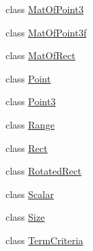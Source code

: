 \begin{DoxyCompactItemize}
\item 
class \mbox{\hyperlink{classorg_1_1opencv_1_1core_1_1_mat_of_point3}{Mat\+Of\+Point3}}
\item 
class \mbox{\hyperlink{classorg_1_1opencv_1_1core_1_1_mat_of_point3f}{Mat\+Of\+Point3f}}
\item 
class \mbox{\hyperlink{classorg_1_1opencv_1_1core_1_1_mat_of_rect}{Mat\+Of\+Rect}}
\item 
class \mbox{\hyperlink{classorg_1_1opencv_1_1core_1_1_point}{Point}}
\item 
class \mbox{\hyperlink{classorg_1_1opencv_1_1core_1_1_point3}{Point3}}
\item 
class \mbox{\hyperlink{classorg_1_1opencv_1_1core_1_1_range}{Range}}
\item 
class \mbox{\hyperlink{classorg_1_1opencv_1_1core_1_1_rect}{Rect}}
\item 
class \mbox{\hyperlink{classorg_1_1opencv_1_1core_1_1_rotated_rect}{Rotated\+Rect}}
\item 
class \mbox{\hyperlink{classorg_1_1opencv_1_1core_1_1_scalar}{Scalar}}
\item 
class \mbox{\hyperlink{classorg_1_1opencv_1_1core_1_1_size}{Size}}
\item 
class \mbox{\hyperlink{classorg_1_1opencv_1_1core_1_1_term_criteria}{Term\+Criteria}}
\end{DoxyCompactItemize}
